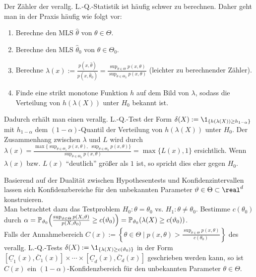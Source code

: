 \begin{Bem}
    Der Zähler der verallg. L.-Q.-Statistik ist häufig schwer zu berechnen.
    Daher geht man in der Praxis häufig wie folgt vor:
    \begin{enumerate}[label=\arabic*.]
        \item
        Berechne den MLS $\widehat{\theta}$ von $\theta \in \Theta$.
        
        \item
        Berechne den MLS $\widehat{\theta}_0$ von $\theta \in \Theta_0$.
        
        \item
        Berechne $\lambda(x) := \frac{p(x, \widehat{\theta})}{p(x, \widehat{\theta}_0)}
        = \frac{\sup_{\theta \in \Theta} p(x, \theta)}{\sup_{\theta \in \Theta_0} p(x, \theta)}$
        (leichter zu berechnender Zähler).
        
        \item
        Finde eine strikt monotone Funktion $h$ auf dem Bild von $\lambda$,
        sodass die Verteilung von $h(\lambda(X))$ unter $H_0$ bekannt ist.
    \end{enumerate}
    Dadurch erhält man einen verallg. L.-Q.-Test der Form
    $\delta(X) := \1_{\{h(\lambda(X)) \ge h_{1-\alpha}\}}$
    mit $h_{1-\alpha}$ dem $(1-\alpha)$-Quantil der Verteilung von $h(\lambda(X))$ unter $H_0$.
    Der Zusammenhang zwischen $\lambda$ und $L$ wird durch
    $\lambda(x) = \frac{\max\{\sup_{\theta \in \Theta_1} p(x, \theta),\;
    \sup_{\theta \in \Theta_0} p(x, \theta)\}}{\sup_{\theta \in \Theta_0} p(x, \theta)}
    = \max\{L(x), 1\}$ ersichtlich.
    Wenn $\lambda(x)$ bzw. $L(x)$ "`deutlich"' größer als $1$ ist, so spricht dies eher
    gegen $H_0$.
\end{Bem}

\linie
\pagebreak

\begin{Bem}
    Basierend auf der Dualität zwischen Hypothesentests und Konfidenzintervallen lassen sich
    Konfidenzbereiche für den unbekannten Parameter $\theta \in \Theta \subset \real^d$
    konstruieren.\\
    Man betrachtet dazu das Testproblem $H_0\colon \theta = \theta_0$ vs.
    $H_1\colon \theta \not= \theta_0$.
    Bestimme $c(\theta_0)$ durch $\alpha =
    \mathbb{P}_{\vartheta_0}\!\left(\frac{\sup_{\vartheta \in \Theta}
    p(X, \vartheta)}{p(X, \vartheta_0)} \ge c(\vartheta_0)\right)
    = \mathbb{P}_{\vartheta_0}(\lambda(X) \ge c(\vartheta_0))$.\\
    Falls der Annahmebereich
    $C(x) := \left\{\theta \in \Theta \;|\;
    p(x, \theta) > \frac{\sup_{\theta \in \Theta} p(x, \theta)}{c(\theta_0)}\right\}$
    des verallg. L.-Q.-Tests $\delta(X) := \1_{\{\lambda(X) \ge c(\theta_0)\}}$
    in der Form
    $[\underline{C}_1(x), \overline{C}_1(x)] \times \dotsb \times
    [\underline{C}_d(x), \overline{C}_d(x)]$ geschrieben werden kann,
    so ist $C(x)$ ein $(1-\alpha)$-Konfidenzbereich für den unbekannten Parameter
    $\theta \in \Theta$.
\end{Bem}

